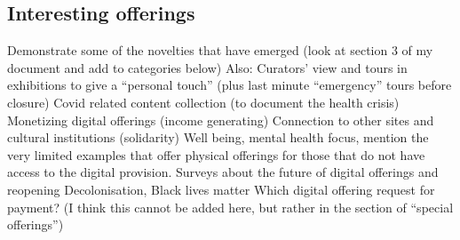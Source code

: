 \documentclass{egpubl}
\begin{document}
\subsection{Interesting offerings}
\label{int}
Demonstrate some of the novelties that have emerged (look at section 3 of my document and add to categories below)
Also: 
Curators’ view and tours in exhibitions to give a “personal touch” (plus last minute “emergency” tours before closure)
Covid related content collection (to document the health crisis)
Monetizing digital offerings (income generating)
Connection to other sites and cultural institutions (solidarity)
Well being, mental health focus, mention the very limited examples that offer physical offerings for those  that do not have access to the digital provision.
Surveys about the future of digital offerings and reopening
Decolonisation, Black lives matter
Which digital offering request for payment? (I think this cannot be added here, but rather in the section of “special offerings”)
\end{document}
